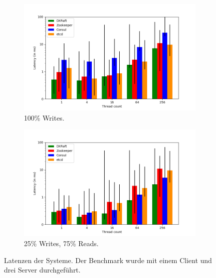 \begin{figure}[t]
	\centering
	\begin{subfigure}[t]{0.45\textwidth}
		\includegraphics[width=\textwidth]{img/latency.png}
		\caption{100\% Writes.}
	\end{subfigure}
	\begin{subfigure}[t]{0.45\textwidth}
		\includegraphics[width=\textwidth]{img/latency2.png}
		\caption{25\% Writes, 75\% Reads.}
	\end{subfigure}
	\caption{Latenzen der Systeme. Der Benchmark wurde mit einem Client und drei Server durchgeführt.}
	\label{fig:latency}
\end{figure}

